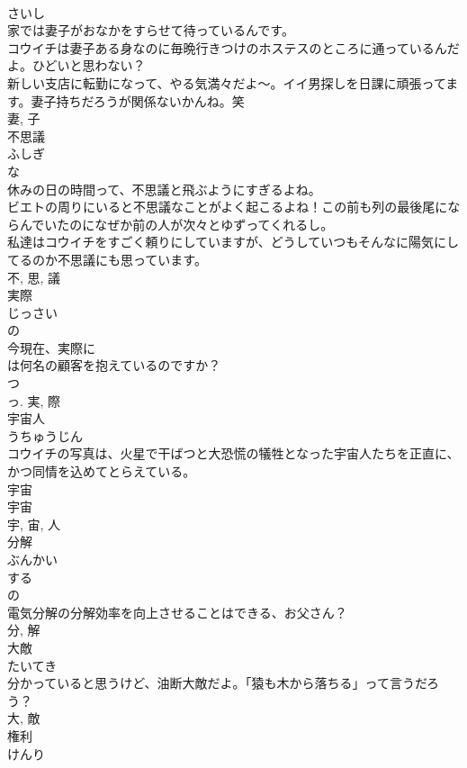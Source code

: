 \documentclass[8pt]{extreport}
\begin{document}
\begin{CJK}{UTF8}{min}
\\	さいし	
\\	家では妻子がおなかをすらせて待っているんです。	
\\	コウイチは妻子ある身なのに毎晩行きつけのホステスのところに通っているんだよ。ひどいと思わない？	
\\	新しい支店に転勤になって、やる気満々だよ〜。イイ男探しを日課に頑張ってます。妻子持ちだろうが関係ないかんね。笑	
\\	妻, 子	
\\	不思議	
\\	ふしぎ	
\\	な 
\\	休みの日の時間って、不思議と飛ぶようにすぎるよね。	
\\	ビエトの周りにいると不思議なことがよく起こるよね！この前も列の最後尾にならんでいたのになぜか前の人が次々とゆずってくれるし。	
\\	私達はコウイチをすごく頼りにしていますが、どうしていつもそんなに陽気にしてるのか不思議にも思っています。	
\\	不, 思, 議	
\\	実際	
\\	じっさい	
\\	の 
\\	今現在、実際に
\\	は何名の顧客を抱えているのですか？	
\\	つ 
\\	っ.	実, 際	
\\	宇宙人	
\\	うちゅうじん	
\\	コウイチの写真は、火星で干ばつと大恐慌の犠牲となった宇宙人たちを正直に、かつ同情を込めてとらえている。	
\\	宇宙 
\\	宇宙 
\\	宇, 宙, 人	
\\	分解	
\\	ぶんかい	
\\	する 
\\	の 
\\	電気分解の分解効率を向上させることはできる、お父さん？	
\\	分, 解	
\\	大敵	
\\	たいてき	
\\	分かっていると思うけど、油断大敵だよ。「猿も木から落ちる」って言うだろう？	
\\	大, 敵	
\\	権利	
\\	けんり	

\end{CJK}
\end{document}
